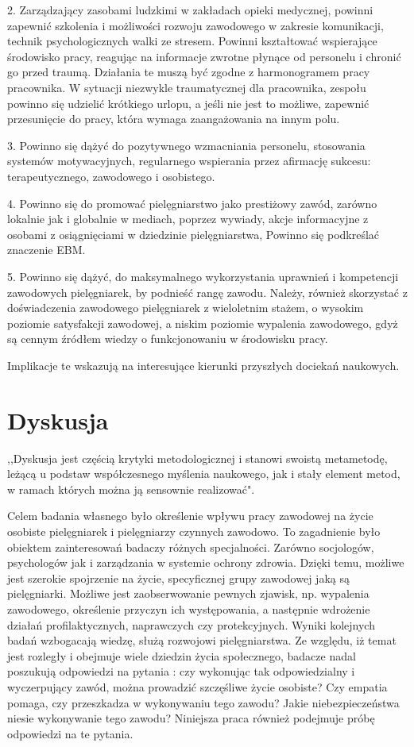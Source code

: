 \documentclass[a4paper,12pt,twoside,openright]{mwrep}
\begin{document}
2.	Zarządzający zasobami ludzkimi w zakładach opieki medycznej, powinni zapewnić szkolenia i możliwości rozwoju zawodowego w zakresie komunikacji, technik psychologicznych walki ze stresem. Powinni kształtować wspierające środowisko pracy, reagując na informacje zwrotne płynące od personelu i chronić go przed traumą. Działania te muszą być zgodne z harmonogramem pracy pracownika. W sytuacji niezwykle traumatycznej dla pracownika, zespołu powinno się udzielić krótkiego urlopu, a jeśli nie jest to możliwe, zapewnić przesunięcie do pracy, która wymaga zaangażowania na innym polu.

3.	Powinno się dążyć do pozytywnego wzmacniania personelu, stosowania systemów motywacyjnych, regularnego wspierania przez afirmację sukcesu: terapeutycznego, zawodowego i osobistego.

4.	Powinno się do promować pielęgniarstwo jako prestiżowy zawód, zarówno lokalnie jak i globalnie w mediach, poprzez wywiady, akcje informacyjne z osobami z osiągnięciami w dziedzinie pielęgniarstwa, Powinno się podkreślać znaczenie EBM.

5.	Powinno się dążyć, do maksymalnego wykorzystania uprawnień i kompetencji zawodowych pielęgniarek, by podnieść rangę zawodu. Należy, również skorzystać z doświadczenia zawodowego pielęgniarek z wieloletnim stażem, o wysokim poziomie satysfakcji zawodowej, a niskim poziomie wypalenia zawodowego, gdyż są cennym źródłem wiedzy o funkcjonowaniu w środowisku pracy.


Implikacje te wskazują na interesujące kierunki przyszłych dociekań naukowych.


\section*{Dyskusja}
,,Dyskusja jest częścią krytyki metodologicznej i stanowi swoistą metametodę, leżącą u podstaw współczesnego myślenia naukowego, jak i stały element metod, w ramach których można ją sensownie realizować"\cite{krytyka}.


Celem badania własnego było określenie wpływu pracy zawodowej na życie osobiste pielęgniarek i pielęgniarzy czynnych zawodowo. To zagadnienie było obiektem zainteresowań badaczy różnych specjalności. Zarówno socjologów, psychologów jak i zarządzania w systemie ochrony zdrowia.  Dzięki temu, możliwe jest szerokie spojrzenie na życie, specyficznej grupy zawodowej jaką są pielęgniarki. Możliwe jest zaobserwowanie pewnych zjawisk, np. wypalenia zawodowego, określenie przyczyn ich występowania, a następnie wdrożenie działań profilaktycznych, naprawczych czy protekcyjnych. Wyniki kolejnych badań wzbogacają wiedzę, służą rozwojowi pielęgniarstwa. Ze względu, iż temat jest rozległy i obejmuje wiele dziedzin życia społecznego, badacze nadal poszukują odpowiedzi na pytania : czy wykonując tak odpowiedzialny i wyczerpujący zawód, można prowadzić szczęśliwe życie osobiste? Czy empatia pomaga, czy przeszkadza w wykonywaniu tego zawodu? Jakie niebezpieczeństwa niesie wykonywanie tego zawodu? Niniejsza praca również podejmuje próbę odpowiedzi na te pytania.
\end{document}
